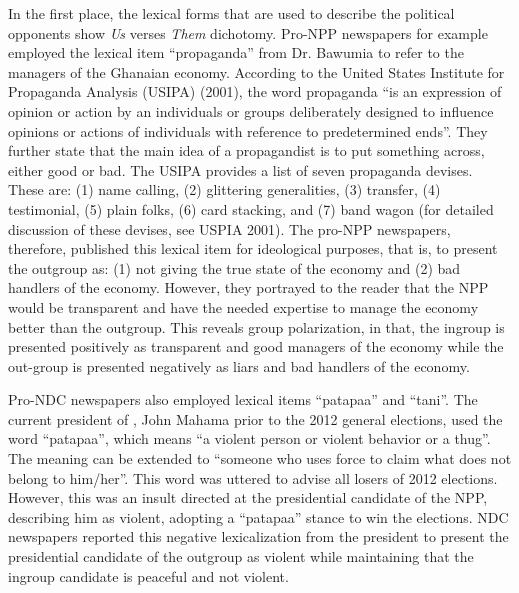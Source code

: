 \documentclass[output=paper,modfonts]{langscibook}
\begin{document}
In the first place, the lexical forms that are used to describe the political opponents show \textit{Us} verses \textit{Them} dichotomy. Pro-NPP newspapers for example employed the lexical item “propaganda” from Dr. Bawumia to refer to the managers of the Ghanaian economy. According to the United States Institute for Propaganda Analysis (USIPA) (2001), the word propaganda “is an expression of opinion or action by an individuals or groups deliberately designed to influence opinions or actions of individuals with reference to predetermined ends”. They further state that the main idea of a propagandist is to put something across, either good or bad. The USIPA provides a list of seven propaganda devises. These are: (1) name calling, (2) glittering generalities, (3) transfer, (4) testimonial, (5) plain folks, (6) card stacking, and (7) band wagon (for detailed discussion of these devises, see USPIA 2001). The pro-NPP newspapers, therefore, published this lexical item for ideological purposes, that is, to present the outgroup as: (1) not giving the true state of the economy and (2) bad handlers of the economy. However, they portrayed to the reader that the NPP would be transparent and have the needed expertise to manage the economy better than the outgroup. This reveals group polarization, in that, the ingroup is presented positively as transparent and good managers of the economy while the out-group is presented negatively as liars and bad handlers of the economy.

Pro-NDC newspapers also employed lexical items “patapaa” and “tani”. The current president of , John Mahama prior to the 2012 general elections, used the word “patapaa”, which means “a violent person or violent behavior or a thug”. The meaning can be extended to “someone who uses force to claim what does not belong to him/her”. This word was uttered to advise all losers of 2012 elections. However, this was an insult directed at the presidential candidate of the NPP, describing him as violent, adopting a “patapaa” stance to win the elections. NDC newspapers reported this negative lexicalization from the president to present the presidential candidate of the outgroup as violent while maintaining that the ingroup candidate is peaceful and not violent.
\end{document}
